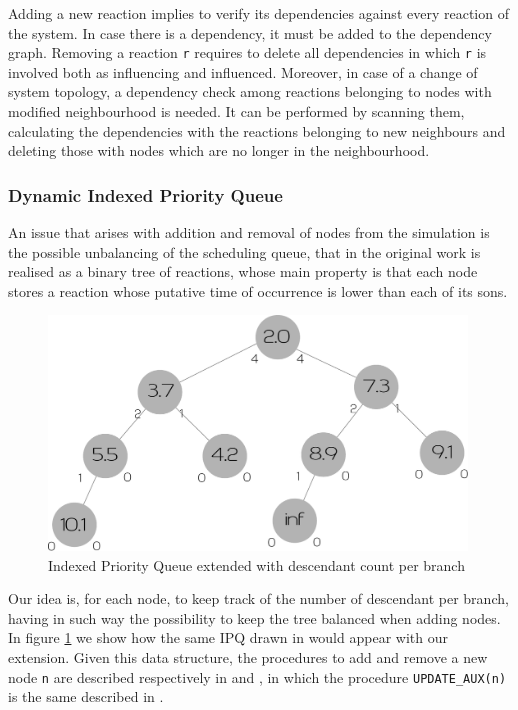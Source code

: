 \documentclass[12pt,a4paper,twoside,openright]{book}
\begin{document}
Adding a new reaction implies to verify its dependencies against every reaction of the system. In case there is a dependency, it must be added to the dependency graph. 
Removing a reaction \texttt{r} requires to delete all dependencies in which \texttt{r} is involved both as influencing and influenced.
Moreover, in case of a change of system topology, a dependency check among reactions belonging to nodes with modified neighbourhood is needed. It can be performed by scanning them, calculating the dependencies with the reactions belonging to new neighbours and deleting those with nodes which are no longer in the neighbourhood.

\subsubsection{Dynamic Indexed Priority Queue}

An issue that arises with addition and removal of nodes from the simulation is the possible unbalancing of the scheduling queue, that in the original work is realised as a binary tree of reactions, whose main property is that each node stores a reaction whose putative time of occurrence is lower than each of its sons.

\begin{figure}%
  \begin{center}
    \includegraphics[width=0.99\textwidth]{img/extipq.pdf}
    \caption{Indexed Priority Queue extended with descendant count per branch}
    \label{img:ipq}
  \end{center}
\end{figure}

Our idea is, for each node, to keep track of the number of descendant per branch, having in such way the possibility to keep the tree balanced when adding nodes. In figure \ref{img:ipq} we show how the same IPQ drawn in \cite{gibson2000} would appear with our extension. Given this data structure, the procedures to add and remove a new node \texttt{n} are described respectively in  and , in which the procedure \texttt{UPDATE\_AUX(n)} is the same described in \cite{gibson2000}.
\end{document}

